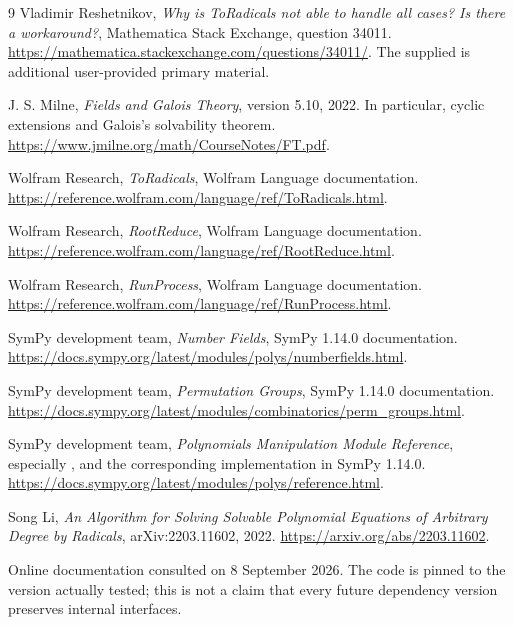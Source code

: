 \documentclass[11pt,letterpaper]{article}
\theoremstyle{definition}\newtheorem{definition}[theorem]{Definition}
\theoremstyle{remark}\newtheorem{remark}[theorem]{Remark}
\newcommand{\code}[1]{\texttt{\detokenize{#1}}}
\begin{document}
\begin{thebibliography}{9}
Vladimir Reshetnikov, \emph{Why is ToRadicals not able to handle all cases? Is there a workaround?}, Mathematica Stack Exchange, question 34011.
\url{https://mathematica.stackexchange.com/questions/34011/}.
The supplied \code{FindExtension.nb} is additional user-provided primary material.

J. S. Milne, \emph{Fields and Galois Theory}, version 5.10, 2022. In particular, cyclic extensions and Galois's solvability theorem.
\url{https://www.jmilne.org/math/CourseNotes/FT.pdf}.

Wolfram Research, \emph{ToRadicals}, Wolfram Language documentation.
\url{https://reference.wolfram.com/language/ref/ToRadicals.html}.

Wolfram Research, \emph{RootReduce}, Wolfram Language documentation.
\url{https://reference.wolfram.com/language/ref/RootReduce.html}.

Wolfram Research, \emph{RunProcess}, Wolfram Language documentation.
\url{https://reference.wolfram.com/language/ref/RunProcess.html}.

SymPy development team, \emph{Number Fields}, SymPy 1.14.0 documentation.
\url{https://docs.sympy.org/latest/modules/polys/numberfields.html}.

SymPy development team, \emph{Permutation Groups}, SymPy 1.14.0 documentation.
\url{https://docs.sympy.org/latest/modules/combinatorics/perm_groups.html}.

SymPy development team, \emph{Polynomials Manipulation Module Reference}, especially \code{Poly.same_root}, and the corresponding implementation in SymPy 1.14.0.
\url{https://docs.sympy.org/latest/modules/polys/reference.html}.

Song Li, \emph{An Algorithm for Solving Solvable Polynomial Equations of Arbitrary Degree by Radicals}, arXiv:2203.11602, 2022.
\url{https://arxiv.org/abs/2203.11602}.
\end{thebibliography}
\noindent\small Online documentation consulted on 8 September 2026. The code is pinned to the version actually tested; this is not a claim that every future dependency version preserves internal interfaces.
\end{document}
